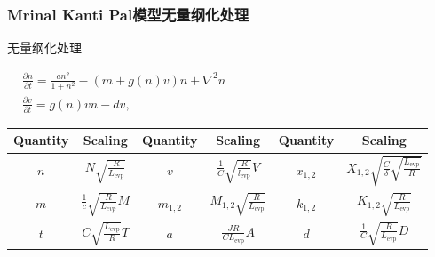 \documentclass[aspectratio=169, 12pt, utf8, mathserif]{ctexbeamer} %
\begin{document}
\begin{frame}
	\frametitle{Mrinal Kanti Pal模型无量纲化处理}
	\begin{exampleblock}{无量纲化处理}
			\begin{center}
		\(\begin{aligned}
			&\frac{\partial n}{\partial t} =\frac{an^2}{1+n^2}-(m+g(n)v)n+\nabla^2n \\
			&\frac{\partial v}{\partial t} =g(n)vn-dv,
		\end{aligned}\)
		\end{center}
		\end{exampleblock}
		
		\begin{center}
		\begin{tabular}{cccccc}
			\toprule %
			Quantity & Scaling & Quantity & Scaling & Quantity & Scaling \\
			\midrule %
			\(n\) & \(N\sqrt{\frac R{L_{\mathrm{evp}}}}\) & \(v\) & \(\frac1C\sqrt{\frac R{l_\mathrm{evp}}}V\) & \(x_{1,2}\) & \(X_{1,2}\sqrt{\frac{C}{\delta}\sqrt{\frac{L_{\mathrm{evp}}}{R}}}\) \\
			
			\(m\) & \(\frac{1}{c}\sqrt{\frac{R}{L_{evp}}}M\) & \(m_{1,2}\) & \(M_{1,2}\sqrt{\frac R{L_{\mathrm{evp}}}}\) & \(k_{1,2}\) & \(K_{1,2}\sqrt{\frac{R}{L_{\mathrm{evp}}}}\) \\
			
			\(t\) & \(C\sqrt{\frac{L_{\mathrm{evp}}}R}T\) & \(a\) & \(\frac{JR}{CL_{\mathrm{evp}}}A\) & \(d\) & \(\frac1C\sqrt{\frac R{L_{\mathrm{evp}}}}D\) \\
			\bottomrule %
		\end{tabular}
		\end{center}	
\end{frame}
\end{document}
